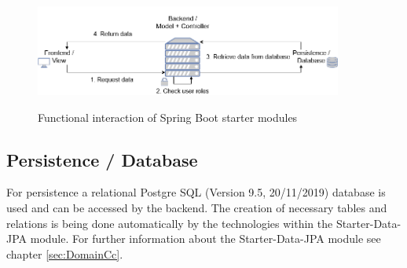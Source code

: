 \begin{figure}[H]
	\centering
	\includegraphics[width=0.9\textwidth]{Content/Domain/BackendDetails.png}
	\caption{Functional interaction of Spring Boot starter modules}
	\cite{own representation}
	\label{fig:backenddetails}
\end{figure}

\subsection{Persistence / Database}
\label{sec:DomainCd}

For persistence a relational Postgre \acs{SQL} (Version 9.5, 20/11/2019) database is used and can be accessed by the backend. 
The creation of necessary tables and relations is being done automatically by the technologies within the Starter-Data-\ac{JPA} module. For further information about the Starter-Data-\ac{JPA} module see chapter \ref{sec:DomainCc}.

